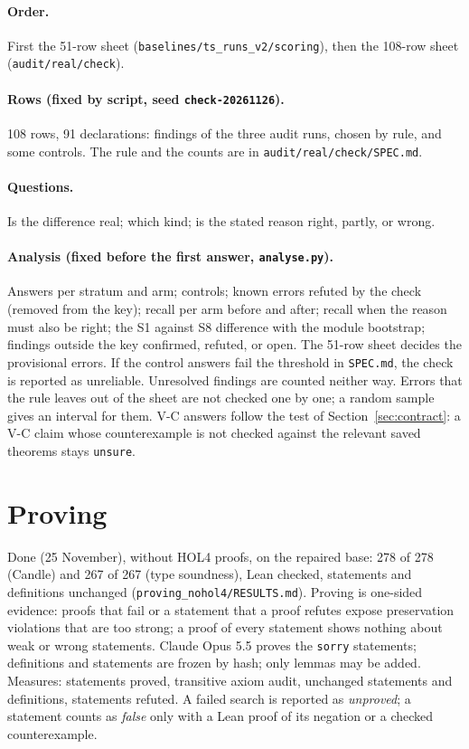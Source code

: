 \documentclass[11pt,a4paper]{article}
\newcommand{\code}[1]{\texttt{#1}}
\begin{document}
\paragraph{Order.} First the 51-row sheet (\code{baselines/ts\_runs\_v2/scoring}), then the 108-row sheet (\code{audit/real/check}).
\paragraph{Rows (fixed by script, seed \code{check-20261126}).} 108 rows, 91 declarations: findings of the three audit runs, chosen by rule, and some controls. The rule and the counts are in \code{audit/real/check/SPEC.md}.
\paragraph{Questions.} Is the difference real; which kind; is the stated reason right, partly, or wrong.
\paragraph{Analysis (fixed before the first answer, \code{analyse.py}).} Answers per stratum and arm; controls; known errors refuted by the check (removed from the key); recall per arm before and after; recall when the reason must also be right; the S1 against S8 difference with the module bootstrap; findings outside the key confirmed, refuted, or open. The 51-row sheet decides the provisional errors. If the control answers fail the threshold in \code{SPEC.md}, the check is reported as unreliable. Unresolved findings are counted neither way. Errors that the rule leaves out of the sheet are not checked one by one; a random sample gives an interval for them. V-C answers follow the test of Section~\ref{sec:contract}: a V-C claim whose counterexample is not checked against the relevant saved theorems stays \code{unsure}.

\section{Proving}\label{sec:proving}
Done (25 November), without HOL4 proofs, on the repaired base: 278 of 278 (Candle) and 267 of 267 (type soundness), Lean checked, statements and definitions unchanged (\code{proving\_nohol4/RESULTS.md}). Proving is one-sided evidence: proofs that fail or a statement that a proof refutes expose preservation violations that are too strong; a proof of every statement shows nothing about weak or wrong statements. Claude Opus 5.5 proves the \code{sorry} statements; definitions and statements are frozen by hash; only lemmas may be added. Measures: statements proved, transitive axiom audit, unchanged statements and definitions, statements refuted. A failed search is reported as \emph{unproved}; a statement counts as \emph{false} only with a Lean proof of its negation or a checked counterexample.
\end{document}
